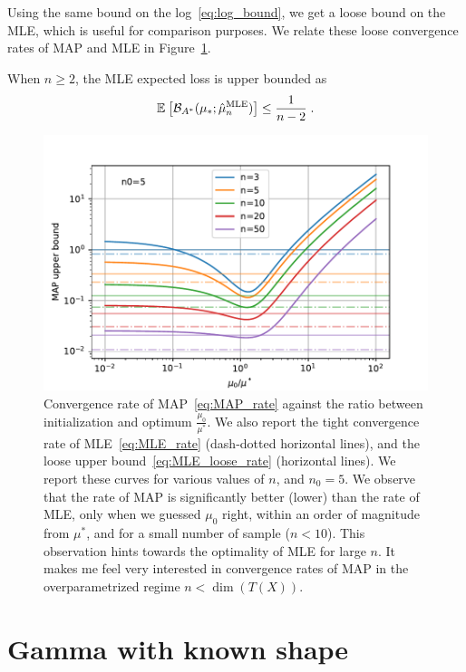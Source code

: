 \documentclass{article}
\newcommand*{\expect}[2][]{\ensuremath{\mathbb{E}_{#1} \left[ #2 \right] }} %
\newcommand{\logpart}{A}
\newcommand{\bregmanconj}{\cB_{\logpart^*}}
\begin{document}
Using the same bound on the log~\eqref{eq:log_bound}, we  get a loose bound on the MLE, which is useful for comparison purposes.
We relate these loose convergence rates of MAP and MLE in Figure~\ref{fig:MAP_rate}.
\begin{example}
\begin{corollary} When $n\geq 2$, the MLE expected loss is upper bounded as
\begin{equation}
	\expect{\bregmanconj( \mu_*; \hat \mu_n^\text{MLE}) }
	\leq \inv{n-2} \; .
	\label{eq:MLE_loose_rate}
\end{equation}
\end{corollary}
\end{example}


\begin{figure}[ht]
	\centering
	\includegraphics[width=.7\textwidth]{figs/MAP_rates/MAP_rate_n0=5.pdf}
	\caption{
	Convergence rate of MAP~\eqref{eq:MAP_rate} 
	\label{fig:MAP_rate} against the ratio between initialization and optimum $ \frac{\mu_0}{\mu^*}$. 
	We also report the tight convergence rate of MLE~\eqref{eq:MLE_rate} (dash-dotted horizontal lines), and the loose upper bound~\eqref{eq:MLE_loose_rate} (horizontal lines). 
	We report these curves for various values of $n$, and $n_0=5$. 
	We observe that the rate of MAP is significantly better (lower) than the rate of MLE, only when we guessed $\mu_0$ right, within an order of magnitude from $\mu^*$, and for a small number of sample ($n<10$). 
	This observation hints towards the optimality of MLE for large $n$. 
	It makes me feel very interested in convergence rates of MAP in the overparametrized regime $n<\dim(T(X))$.
	}
\end{figure}


\section{Gamma with known shape}
\end{document}
